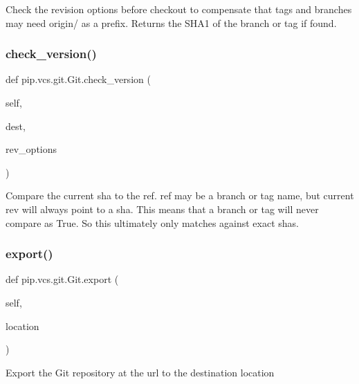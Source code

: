 \begin{DoxyVerb}Check the revision options before checkout to compensate that tags
and branches may need origin/ as a prefix.
Returns the SHA1 of the branch or tag if found.
\end{DoxyVerb}
 \mbox{\label{classpip_1_1vcs_1_1git_1_1_git_a46aa03992931441d49a275a4e15953c2}} 
\subsubsection{\texorpdfstring{check\+\_\+version()}{check\_version()}}
{\footnotesize\ttfamily def pip.\+vcs.\+git.\+Git.\+check\+\_\+version (\begin{DoxyParamCaption}\item[{}]{self,  }\item[{}]{dest,  }\item[{}]{rev\+\_\+options }\end{DoxyParamCaption})}

\begin{DoxyVerb}Compare the current sha to the ref. ref may be a branch or tag name,
but current rev will always point to a sha. This means that a branch
or tag will never compare as True. So this ultimately only matches
against exact shas.
\end{DoxyVerb}
 \mbox{\label{classpip_1_1vcs_1_1git_1_1_git_ae58419806faec1e58516a3d253b63611}} 
\subsubsection{\texorpdfstring{export()}{export()}}
{\footnotesize\ttfamily def pip.\+vcs.\+git.\+Git.\+export (\begin{DoxyParamCaption}\item[{}]{self,  }\item[{}]{location }\end{DoxyParamCaption})}

\begin{DoxyVerb}Export the Git repository at the url to the destination location\end{DoxyVerb}
 \mbox{\label{classpip_1_1vcs_1_1git_1_1_git_a047000fdc1194f32005744dff5ac929d}} 
